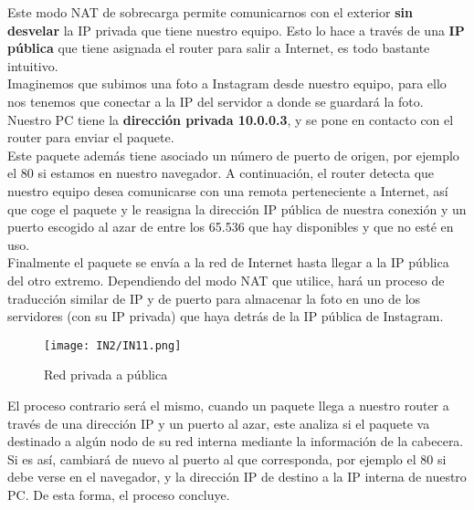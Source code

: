 \documentclass[
	12pt, %
	fleqn, %
	a4paper, %
	oneside, %
]{LegrandOrangeBook}
\begin{document}
Este modo NAT de sobrecarga permite comunicarnos con el exterior \textbf{sin desvelar} la IP privada que tiene nuestro equipo. Esto lo hace a través de una \textbf{IP pública} que tiene asignada el router para salir a Internet, es todo bastante intuitivo.\\
Imaginemos que subimos una foto a Instagram desde nuestro equipo, para ello nos tenemos que conectar a la IP del servidor a donde se guardará la foto. Nuestro PC tiene la \textbf{dirección privada 10.0.0.3}, y se pone en contacto con el router para enviar el paquete.\\
Este paquete además tiene asociado un número de puerto de origen, por ejemplo el 80 si estamos en nuestro navegador. A continuación, el router detecta que nuestro equipo desea comunicarse con una remota perteneciente a Internet, así que coge el paquete y le reasigna la dirección IP pública de nuestra conexión y un puerto escogido al azar de entre los 65.536 que hay disponibles y que no esté en uso.\\
Finalmente el paquete se envía a la red de Internet hasta llegar a la IP pública del otro extremo. Dependiendo del modo NAT que utilice, hará un proceso de traducción similar de IP y de puerto para almacenar la foto en uno de los servidores (con su IP privada) que haya detrás de la IP pública de Instagram.
\begin{figure}[H]
\centering
\texttt{[image: IN2/IN11.png]}
\caption{Red privada a pública}
\end{figure}
El proceso contrario será el mismo, cuando un paquete llega a nuestro router a través de una dirección IP y un puerto al azar, este analiza si el paquete va destinado a algún nodo de su red interna mediante la información de la cabecera. Si es así, cambiará de nuevo al puerto al que corresponda, por ejemplo el 80 si debe verse en el navegador, y la dirección IP de destino a la IP interna de nuestro PC. De esta forma, el proceso concluye.
\end{document}
